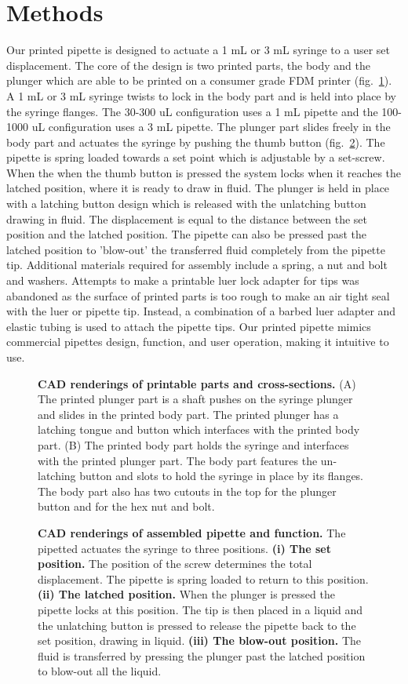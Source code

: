 \documentclass[10pt,letterpaper]{article}
\begin{document}
\section*{Methods}
Our printed pipette is designed to actuate a 1 mL or 3 mL syringe to a user set displacement.
The core of the design is two printed parts, the body and the plunger which are able to be printed on a consumer grade FDM printer (fig.~\ref{fig1}).
A 1 mL or 3 mL syringe twists to lock in the body part and is held into place by the syringe flanges.
The 30-300 uL configuration uses a 1 mL pipette and the 100-1000 uL configuration uses a 3 mL pipette.
The plunger part slides freely in the body part and actuates the syringe by pushing the thumb button (fig.~\ref{fig2}). 
The pipette is spring loaded towards a set point which is adjustable by a set-screw.
When the when the thumb button is pressed the system locks when it reaches the latched position, where it is ready to draw in fluid.
The plunger is held in place with a latching button design which is released with the unlatching button drawing in fluid.
The displacement is equal to the distance between the set position and the latched position.
The pipette can also be pressed past the latched position to 'blow-out' the transferred fluid completely from the pipette tip.   
Additional materials required for assembly include a spring, a nut and bolt and washers.
Attempts to make a printable luer lock adapter for tips was abandoned as the surface of printed parts is too rough to make an air tight seal with the luer or pipette tip.
Instead, a combination of a barbed luer adapter and elastic tubing is used to attach the pipette tips.
Our printed pipette mimics commercial pipettes design, function, and user operation, making it intuitive to use.

\begin{figure}
	\caption{
		{\bf CAD renderings of printable parts and cross-sections.} (A) The printed plunger part is a shaft pushes on the syringe plunger and slides in the printed body part. The printed plunger has a latching tongue and button which interfaces with the printed body part. (B) The printed body part holds the syringe and interfaces with the printed plunger part. The body part features the un-latching button and slots to hold the syringe in place by its flanges. The body part also has two cutouts in the top for the plunger button and for the hex nut and bolt.
	}
	\label{fig1}
\end{figure}

\begin{figure}
	\caption{
		{\bf CAD renderings of assembled pipette and function.} The pipetted actuates the syringe to three positions. {\bf(i) The set position.} The position of the screw determines the total displacement. The pipette is spring loaded to return to this position. {\bf (ii) The latched position.} When the plunger is pressed the pipette locks at this position. The tip is then placed in a liquid and the unlatching button is pressed to release the pipette back to the set position, drawing in liquid. {\bf (iii) The blow-out position.} The fluid is transferred by pressing the plunger past the latched position to blow-out all the liquid.
	}
	\label{fig2}
\end{figure}
\end{document}
